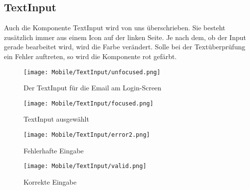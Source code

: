 \newpage
\subsection{TextInput}
Auch die Komponente TextInput wird von uns überschrieben. Sie besteht zusätzlich immer aus einem
Icon auf der linken Seite. Je nach dem, ob der Input gerade bearbeitet wird, wird die Farbe
verändert. Solle bei der Textüberprüfung ein Fehler auftreten, so wird die Komponente rot gefärbt.

\begin{figure}[H]
  \begin{center}
    \texttt{[image: Mobile/TextInput/unfocused.png]}
    \caption{Der TextInput für die Email am Login-Screen}
  \end{center}
\end{figure}

\begin{figure}[H]
  \begin{center}
    \texttt{[image: Mobile/TextInput/focused.png]}
    \caption{TextInput ausgewählt}
  \end{center}
\end{figure}


\begin{figure}[H]
  \begin{center}
    \texttt{[image: Mobile/TextInput/error2.png]}
    \caption{Fehlerhafte Eingabe}
  \end{center}
\end{figure}

\begin{figure}[H]
  \begin{center}
    \texttt{[image: Mobile/TextInput/valid.png]}
    \caption{Korrekte Eingabe}
  \end{center}
\end{figure}